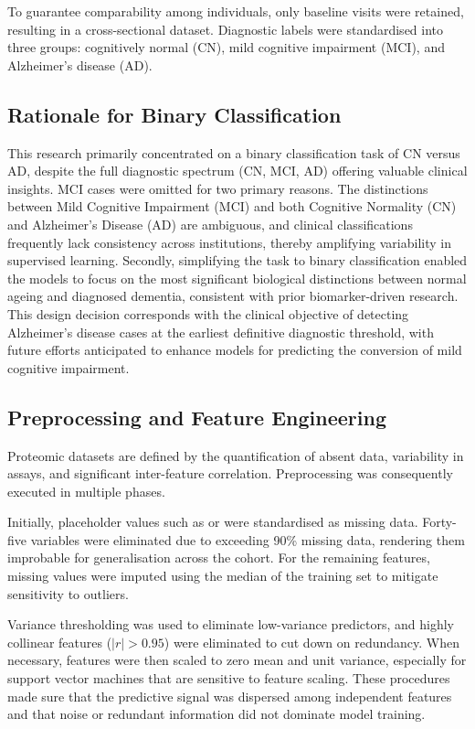 \documentclass[a4paper,12pt]{article}
\begin{document}
To guarantee comparability among individuals, only baseline visits were retained, resulting in a cross-sectional dataset. Diagnostic labels were standardised into three groups: cognitively normal (CN), mild cognitive impairment (MCI), and Alzheimer’s disease (AD).  

\subsection{Rationale for Binary Classification}
This research primarily concentrated on a binary classification task of CN versus AD, despite the full diagnostic spectrum (CN, MCI, AD) offering valuable clinical insights.  MCI cases were omitted for two primary reasons.  The distinctions between Mild Cognitive Impairment (MCI) and both Cognitive Normality (CN) and Alzheimer's Disease (AD) are ambiguous, and clinical classifications frequently lack consistency across institutions, thereby amplifying variability in supervised learning.  Secondly, simplifying the task to binary classification enabled the models to focus on the most significant biological distinctions between normal ageing and diagnosed dementia, consistent with prior biomarker-driven research.  This design decision corresponds with the clinical objective of detecting Alzheimer's disease cases at the earliest definitive diagnostic threshold, with future efforts anticipated to enhance models for predicting the conversion of mild cognitive impairment. 

\subsection{Preprocessing and Feature Engineering}
Proteomic datasets are defined by the quantification of absent data, variability in assays, and significant inter-feature correlation.  Preprocessing was consequently executed in multiple phases.

Initially, placeholder values such as  or  were standardised as missing data.  Forty-five variables were eliminated due to exceeding 90\% missing data, rendering them improbable for generalisation across the cohort.  For the remaining features, missing values were imputed using the median of the training set to mitigate sensitivity to outliers. 

Variance thresholding was used to eliminate low-variance predictors, and highly collinear features ($|r| > 0.95$) were eliminated to cut down on redundancy.  When necessary, features were then scaled to zero mean and unit variance, especially for support vector machines that are sensitive to feature scaling.  These procedures made sure that the predictive signal was dispersed among independent features and that noise or redundant information did not dominate model training.
\end{document}
